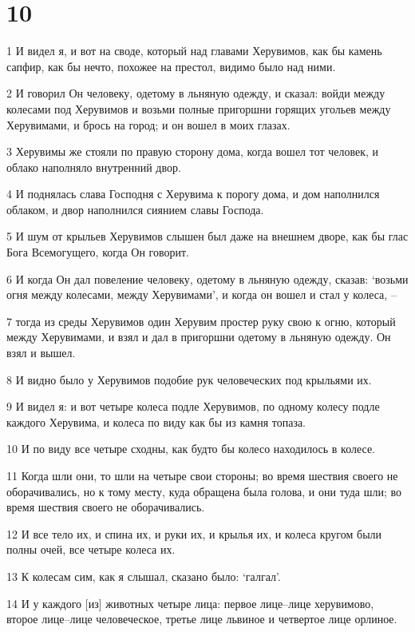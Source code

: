 \chapter{10}

\par 1 И видел я, и вот на своде, который над главами Херувимов, как бы камень сапфир, как бы нечто, похожее на престол, видимо было над ними.
\par 2 И говорил Он человеку, одетому в льняную одежду, и сказал: войди между колесами под Херувимов и возьми полные пригоршни горящих угольев между Херувимами, и брось на город; и он вошел в моих глазах.
\par 3 Херувимы же стояли по правую сторону дома, когда вошел тот человек, и облако наполняло внутренний двор.
\par 4 И поднялась слава Господня с Херувима к порогу дома, и дом наполнился облаком, и двор наполнился сиянием славы Господа.
\par 5 И шум от крыльев Херувимов слышен был даже на внешнем дворе, как бы глас Бога Всемогущего, когда Он говорит.
\par 6 И когда Он дал повеление человеку, одетому в льняную одежду, сказав: `возьми огня между колесами, между Херувимами', и когда он вошел и стал у колеса, --
\par 7 тогда из среды Херувимов один Херувим простер руку свою к огню, который между Херувимами, и взял и дал в пригоршни одетому в льняную одежду. Он взял и вышел.
\par 8 И видно было у Херувимов подобие рук человеческих под крыльями их.
\par 9 И видел я: и вот четыре колеса подле Херувимов, по одному колесу подле каждого Херувима, и колеса по виду как бы из камня топаза.
\par 10 И по виду все четыре сходны, как будто бы колесо находилось в колесе.
\par 11 Когда шли они, то шли на четыре свои стороны; во время шествия своего не оборачивались, но к тому месту, куда обращена была голова, и они туда шли; во время шествия своего не оборачивались.
\par 12 И все тело их, и спина их, и руки их, и крылья их, и колеса кругом были полны очей, все четыре колеса их.
\par 13 К колесам сим, как я слышал, сказано было: `галгал'.
\par 14 И у каждого [из] животных четыре лица: первое лице--лице херувимово, второе лице--лице человеческое, третье лице львиное и четвертое лице орлиное.
